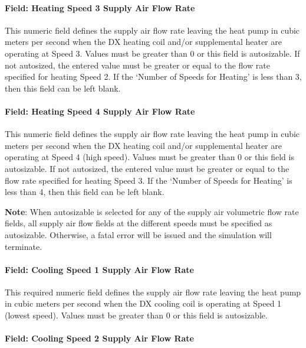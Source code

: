 \paragraph{Field: Heating Speed 3 Supply Air Flow Rate}\label{field-heating-speed-3-supply-air-flow-rate}

This numeric field defines the supply air flow rate leaving the heat pump in cubic meters per second when the DX heating coil and/or supplemental heater are operating at Speed 3. Values must be greater than 0 or this field is autosizable. If not autosized, the entered value must be greater or equal to the flow rate specified for heating Speed 2. If the `Number of Speeds for Heating' is less than 3, then this field can be left blank.

\paragraph{Field: Heating Speed 4 Supply Air Flow Rate}\label{field-heating-speed-4-supply-air-flow-rate}

This numeric field defines the supply air flow rate leaving the heat pump in cubic meters per second when the DX heating coil and/or supplemental heater are operating at Speed 4 (high speed). Values must be greater than 0 or this field is autosizable. If not autosized, the entered value must be greater or equal to the flow rate specified for heating Speed 3. If the `Number of Speeds for Heating' is less than 4, then this field can be left blank.

\textbf{Note}: When autosizable is selected for any of the supply air volumetric flow rate fields, all supply air flow fields at the different speeds must be specified as autosizable. Otherwise, a fatal error will be issued and the simulation will terminate.

\paragraph{Field: Cooling Speed 1 Supply Air Flow Rate}\label{field-cooling-speed-1-supply-air-flow-rate}

This required numeric field defines the supply air flow rate leaving the heat pump in cubic meters per second when the DX cooling coil is operating at Speed 1 (lowest speed). Values must be greater than 0 or this field is autosizable.

\paragraph{Field: Cooling Speed 2 Supply Air Flow Rate}\label{field-cooling-speed-2-supply-air-flow-rate}

